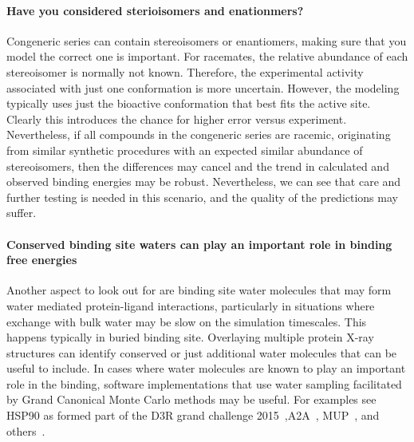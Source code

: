 \documentclass[9pt,bestpractices]{livecoms}
\begin{document}
\paragraph{Have you considered sterioisomers and enationmers?}
Congeneric series can contain stereoisomers or enantiomers, making sure that you model the correct one is important. For racemates, the relative abundance of each stereoisomer is normally not known. Therefore, the experimental activity associated with just one conformation is more uncertain. However, the modeling typically uses just the bioactive conformation that best fits the active site. Clearly this introduces the chance for higher error versus experiment. Nevertheless, if all compounds in the congeneric series are racemic, originating from similar synthetic procedures with an expected similar abundance of stereoisomers, then the differences may cancel and the trend in calculated and observed binding energies may be robust. Nevertheless, we can see that care and further testing is needed in this scenario, and the quality of the predictions may suffer.   
%
\paragraph{Conserved binding site waters can play an important role in binding free energies}
Another aspect to look out for are binding site water molecules that may form water mediated protein-ligand interactions, particularly in situations where exchange with bulk water may be slow on the simulation timescales. This happens typically in buried binding site. Overlaying multiple protein X-ray structures can identify conserved or just additional water molecules that can be useful to include. In cases where water molecules are known to play an important role in the binding, software implementations that use water sampling facilitated by Grand Canonical Monte Carlo methods may be useful. For examples see HSP90 as formed part of the D3R grand challenge 2015~\cite{mey2016blinded},A2A~\cite{brucemacdonald2018ligand}, MUP~\cite{ross2015water}, and others~\cite{michel2009energetics}.
%
\end{document}
